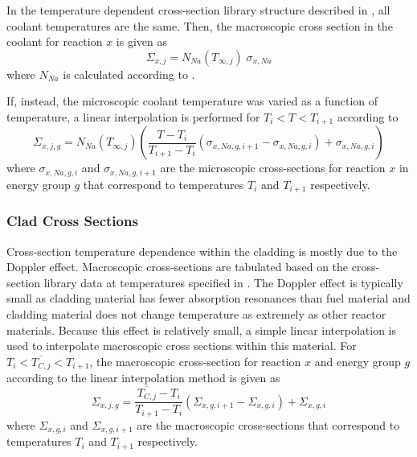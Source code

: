       In the temperature dependent cross-section library structure described in
      , all coolant temperatures are the same. Then, the
      macroscopic cross section in the coolant for reaction $x$ is given as
      \begin{equation}
        \Sigma_{x,j} = N_{Na}(T_{\infty,j}) \; \sigma_{x,Na}
      \end{equation}
      where $N_{Na}$ is calculated according to .

      If, instead, the microscopic coolant temperature was varied as a function
      of temperature, a linear interpolation is performed for $T_{i}<T<T_{i+1}$
      according to
      \begin{equation}
        \label{eq:cs_cool}
        \Sigma_{x,j,g} = N_{Na}(T_{\infty,j}) 
          \left( \frac{T - T_{i}}{T_{i+1}-T_{i}} 
          (\sigma_{x,Na,g,i+1} - \sigma_{x,Na,g,i})  + \sigma_{x,Na,g,i}\right)
      \end{equation}
      where $\sigma_{x,Na,g,i}$ and $\sigma_{x,Na,g,i+1}$ are the microscopic 
      cross-sections for reaction $x$ in energy group $g$ that correspond to 
      temperatures $T_i$ and $T_{i+1}$ respectively.

    \subsubsection{Clad Cross Sections}
      Cross-section temperature dependence within the cladding is mostly due to
      the Doppler effect. Macroscopic cross-sections are tabulated based on the
      cross-section library data at temperatures specified in
      . The Doppler effect is typically small as cladding
      material has fewer absorption resonances than fuel material and cladding
      material does not change temperature as extremely as other reactor
      materials. Because this effect is relatively small, a simple linear
      interpolation is used to interpolate macroscopic cross sections within
      this material. For $T_i < \overline{T_{C,j}} < T_{i+1}$, the macroscopic 
      cross-section for reaction $x$ and energy group $g$ according to the 
      linear interpolation method is given as
      \begin{equation}
        \label{eq:xs_linear_interpolation}
        \Sigma_{x,j,g} = 
          \frac{\overline{T_{C,j}} - T_{i}}{T_{i+1}-T_{i}} 
          (\Sigma_{x,g,i+1} - \Sigma_{x,g,i})  + \Sigma_{x,g,i}
      \end{equation}
      where $\Sigma_{x,g,i}$ and $\Sigma_{x,g,i+1}$ are the macroscopic
      cross-sections that correspond to temperatures $T_i$ and $T_{i+1}$
      respectively. 

